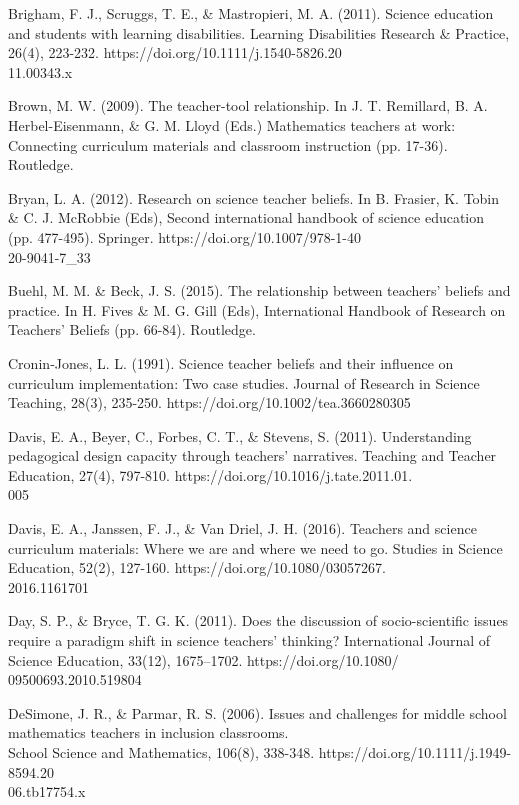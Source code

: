 \documentclass[11.5pt]{sig-alternate}
\begin{document}
\begin{large}
Brigham, F. J., Scruggs, T. E., \& Mastropieri, M. A. (2011). Science education and students with learning disabilities. Learning Disabilities Research \& Practice, 26(4), 223-232. https://doi.org/10.1111/j.1540-5826.20\\11.00343.x

Brown, M. W. (2009). The teacher-tool relationship. In J. T. Remillard, B. A. Herbel-Eisenmann, \& G. M. Lloyd (Eds.) Mathematics teachers at work: Connecting curriculum materials and classroom instruction (pp. 17-36). Routledge.

Bryan, L. A. (2012). Research on science teacher beliefs. In B. Frasier, K. Tobin \& C. J. McRobbie (Eds), Second international handbook of science education (pp. 477-495). Springer. https://doi.org/10.1007/978-1-40\\20-9041-7\_33

Buehl, M. M. \& Beck, J. S. (2015). The relationship between teachers’ beliefs and practice. In H. Fives \& M. G. Gill (Eds), International Handbook of Research on Teachers’ Beliefs (pp. 66-84). Routledge.

Cronin‐Jones, L. L. (1991). Science teacher beliefs and their influence on curriculum implementation: Two case studies. Journal of Research in Science Teaching, 28(3), 235-250. https://doi.org/10.1002/tea.3660280305

Davis, E. A., Beyer, C., Forbes, C. T., \& Stevens, S. (2011). Understanding pedagogical design capacity through teachers’ narratives. Teaching and Teacher Education, 27(4), 797-810. https://doi.org/10.1016/j.tate.2011.01.\\005

Davis, E. A., Janssen, F. J., \& Van Driel, J. H. (2016). Teachers and science curriculum materials: Where we are and where we need to go. Studies in Science Education, 52(2), 127-160. https://doi.org/10.1080/03057267.\\2016.1161701

Day, S. P., \& Bryce, T. G. K. (2011). Does the discussion of socio-scientific issues require a paradigm shift in science teachers’ thinking? International Journal of Science Education, 33(12), 1675–1702. https://doi.org/10.1080/\\09500693.2010.519804

DeSimone, J. R., \& Parmar, R. S. (2006). Issues and challenges for middle school mathematics teachers in inclusion classrooms. \\School Science and Mathematics, 106(8), 338-348. https://doi.org/10.1111/j.1949-8594.20\\06.tb17754.x


\end{large}
\end{document}
